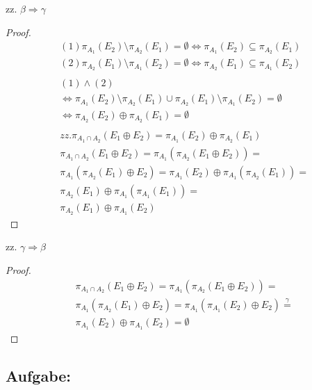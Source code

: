 \documentclass[a4paper]{scrartcl}
\begin{document}
zz. $\beta \Rightarrow \gamma$
\begin{proof}
	\begin{align*}
		& (1) \pi_{A_1}\left(E_2\right) \setminus \pi_{A_2}\left(E_1\right) = \emptyset \iff \pi_{A_1}\left(E_2\right) \subseteq \pi_{A_2}\left(E_1\right) \\
		& (2) \pi_{A_2}\left(E_1\right) \setminus \pi_{A_1}\left(E_2\right) = \emptyset \iff \pi_{A_2}\left(E_1\right) \subseteq \pi_{A_1}\left(E_2\right) \\ \\
		& (1) \wedge (2) \\
		& \iff \pi_{A_1}\left(E_2\right) \setminus \pi_{A_2}\left(E_1\right) \cup \pi_{A_2}\left(E_1\right) \setminus \pi_{A_1}\left(E_2\right) = \emptyset \\
		& \iff \pi_{A_2}\left(E_2\right) \oplus \pi_{A_2}\left(E_1\right) = \emptyset \\ \\
		& zz. \pi_{A_1 \cap A_2}\left(E_1 \oplus E_2\right) = \pi_{A_1}\left(E_2\right) \oplus \pi_{A_2}\left(E_1\right) \\
		& \pi_{A_1 \cap A_2}\left(E_1 \oplus E_2\right) = \pi_{A_1}\left(\pi_{A_2}\left(E_1 \oplus E_2\right)\right) = \\
		& \pi_{A_1}\left(\pi_{A_2}\left(E_1\right) \oplus E_2\right) = \pi_{A_1}\left(E_2\right) \oplus \pi_{A_1}\left(\pi_{A_2}\left(E_1\right)\right) = \\
		& \pi_{A_2}\left(E_1\right) \oplus \pi_{A_1}\left(\pi_{A_1}\left(E_1\right)\right) = \\
		& \pi_{A_2}\left(E_1\right) \oplus \pi_{A_1}\left(E_2\right)
	\end{align*}
\end{proof}

zz. $\gamma \Rightarrow \beta$
\begin{proof}
	\begin{align*}
		& \pi_{A_1 \cap A_2}\left(E_1 \oplus E_2\right) = \pi_{A_1}\left(\pi_{A_2}\left(E_1 \oplus E_2\right)\right) = \\
		& \pi_{A_1}\left(\pi_{A_2}\left(E_1\right) \oplus E_2\right) = \pi_{A_1}\left(\pi_{A_1}\left(E_2\right) \oplus E_2\right) \overset{\gamma}{=} \\
		& \pi_{A_1}\left(E_2\right) \oplus \pi_{A_1}\left(E_2\right) = \emptyset
	\end{align*}
\end{proof}

\subsection{Aufgabe:}
\end{document}
